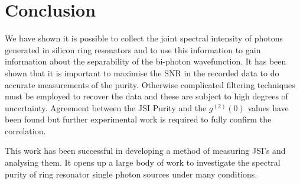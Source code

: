 \section{Conclusion}
We have shown it is possible to collect the joint spectral intensity of photons generated in silicon ring resonators and to use this information to gain information about the separability of the bi-photon wavefunction. It has been shown that it is important to maximise the SNR in the recorded data to do accurate measurements of the purity. Otherwise complicated filtering techniques must be employed to recover the data and these are subject to high degrees of uncertainty.  Agreement between the JSI Purity and the $g^{(2)}(0)$ values have been found but further experimental work is required to fully confirm the correlation. 

This work has been successful in developing a method of measuring JSI's and analysing them. It opens up a large body of work to investigate the spectral purity of ring resonator single photon sources under many conditions.
